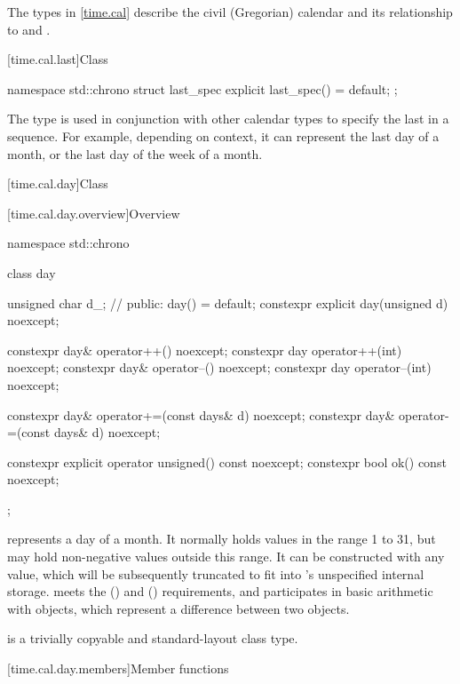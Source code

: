 \pnum
The types in \ref{time.cal} describe the civil (Gregorian) calendar
and its relationship to  and .

[time.cal.last]{Class }
%

\begin{codeblock}
namespace std::chrono {
  struct last_spec {
    explicit last_spec() = default;
  };
}
\end{codeblock}

\pnum
The type  is used
in conjunction with other calendar types
to specify the last in a sequence.
For example, depending on context,
it can represent the last day of a month,
or the last day of the week of a month.

[time.cal.day]{Class }

[time.cal.day.overview]{Overview}

\begin{codeblock}
namespace std::chrono {
  class day {
    unsigned char d_;           // \expos
  public:
    day() = default;
    constexpr explicit day(unsigned d) noexcept;

    constexpr day& operator++()    noexcept;
    constexpr day  operator++(int) noexcept;
    constexpr day& operator--()    noexcept;
    constexpr day  operator--(int) noexcept;

    constexpr day& operator+=(const days& d) noexcept;
    constexpr day& operator-=(const days& d) noexcept;

    constexpr explicit operator unsigned() const noexcept;
    constexpr bool ok() const noexcept;
  };
}
\end{codeblock}

\pnum
{} represents a day of a month.
It normally holds values in the range 1 to 31,
but may hold non-negative values outside this range.
It can be constructed with any  value,
which will be subsequently truncated to fit into 's unspecified internal storage.
 meets the  ()
and  () requirements,
and participates in basic arithmetic with  objects,
which represent a difference between two  objects.

\pnum
{} is a trivially copyable and standard-layout class type.

[time.cal.day.members]{Member functions}

